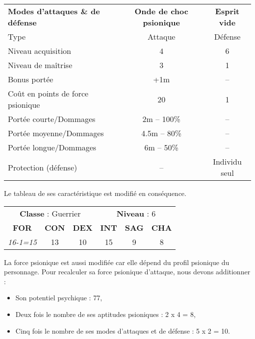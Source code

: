 \bigskip

\begin{tabular}{lcc}
\textbf{Modes d'attaques \& de défense} & \textbf{Onde de choc psionique} & \textbf{Esprit vide}\\
Type                                & Attaque           & Défense\\
Niveau acquisition                  & 4                 & 6 \\
Niveau de maîtrise                  & 3                 & 1\\
Bonus portée                        & +1m               & --\\
Coût en points de force psionique   & 20                & 1 \\
Portée courte/Dommages              & 2m -- 100\%       & --\\
Portée moyenne/Dommages             & 4.5m -- 80\%      & -- \\
Portée longue/Dommages              & 6m -- 50\%        & --\\
Protection (défense)                & --                & Individu seul \\
\end{tabular}

\bigskip

Le tableau de ses caractéristique est modifié en conséquence.

\bigskip

\begin{tabular}{cccccc}
\multicolumn{3}{c}{\textbf{Classe} : Guerrier} & \multicolumn{3}{c}{\textbf{Niveau} : 6} \\
\textbf{FOR} & \textbf{CON} & \textbf{DEX} & \textbf{INT} & \textbf{SAG} & \textbf{CHA} \\
\textit{16-1=15} & 13 & 10 & 15 & 9 & 8 \\
\end{tabular}

\bigskip

La force psionique est aussi modifiée car elle dépend du profil psionique du personnage. Pour recalculer sa force psionique d'attaque, nous devons additionner :

\bigskip

\begin{itemize}
\item Son potentiel psychique : 77,
\item Deux fois le nombre de ses aptitudes psioniques : 2 x 4 = 8,
\item Cinq fois le nombre de ses modes d'attaques et de défense : 5 x 2 = 10.
\end{itemize}

